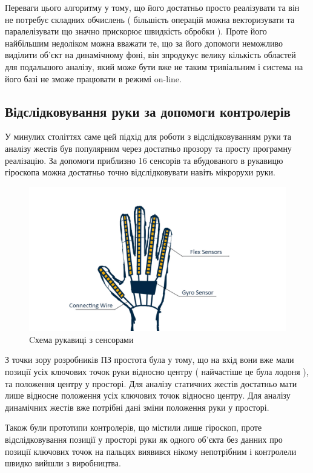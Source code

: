 Переваги цього алгоритму у тому, що його достатньо просто реалізувати та він не потребує складних обчислень ( більшість операцій можна векторизувати та паралелізувати що значно прискорює швидкість обробки ). Проте його найбільшим недоліком можна вважати те, що за його допомоги неможливо виділити об'єкт на динамічному фоні, він зпродукує велику кількість областей для подальшого аналізу, який може бути вже не таким тривіальним і система на його базі не зможе працювати в режимі on-line.

\subsection{Відслідковування руки за допомоги контролерів}

У минулих століттях саме цей підхід для роботи з відслідковуванням руки та аналізу жестів був популярним через достатньо прозору та просту програмну реалізацію. За допомоги приблизно 16 сенсорів та вбудованого в рукавицю гіроскопа можна достатньо точно відслідковувати навіть мікрорухи руки.

\begin{figure}[H]
	\includegraphics[width=0.9\linewidth]{task_analysis/img/wired_glove}
	\caption{Cхема рукавиці з сенсорами}
\end{figure}

З точки зору розробників ПЗ простота була у тому, що на вхід вони вже мали позиції усіх ключових точок руки відносно центру ( найчастіше це була лодоня ), та положення центру у просторі. Для аналізу статичних жестів достатньо мати лише відносне положення усіх ключових точок відносно центру. Для аналізу динамічних жестів вже потрібні дані зміни положення руки у просторі.

Також були прототипи контролерів, що містили лише гіроскоп, проте відслідковування позиції у просторі руки як одного об'єкта без данних про позиції ключових точок на пальцях виявився нікому непотрібним і контролели швидко вийшли з виробництва.

